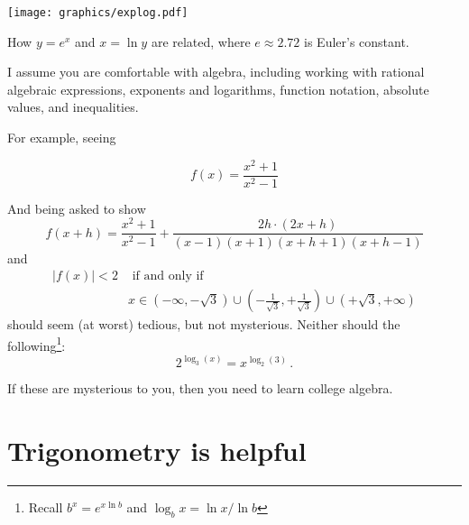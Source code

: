 \begin{marginfigure}
\texttt{[image: graphics/explog.pdf]}
\caption{How $y=e^x$ and $x=\ln y$ are related, where $e \approx 2.72$ is Euler's constant.}
\label{fig:explog}
\end{marginfigure}

I assume you are comfortable with algebra, including working with rational algebraic expressions, exponents and logarithms, function notation, absolute values, and inequalities.

For example, seeing 

\begin{equation*}
f(x)=\frac{x^2+1}{x^2-1}
\end{equation*}

And being asked to show
\begin{equation*}
    f(x+h)=\frac{x^2+1}{x^2-1}+ \frac{2h\cdot(2x+h)}{(x-1)(x+1)(x+h+1)(x+h-1)}
\end{equation*}
and
\begin{align*}
  |f(x)|<2 & \text{ if and only if } \\
           &  x \in (-\infty,-\sqrt{3})\cup(-\frac{1}{\sqrt{3}},+\frac{1}{\sqrt{3}})\cup(+\sqrt{3},+\infty)
\end{align*}
should seem (at worst) tedious, but not mysterious.  Neither should the following\footnote{Recall $b^x=e^{x \ln b}$ and $\log_b x=\ln x/\ln b$}:
\begin{equation*}
    2^{\log_3(x)}=x^{\log_2(3)} \,.
\end{equation*}

If these are mysterious to you, then you need to learn college algebra.
\section*{Trigonometry is helpful}

